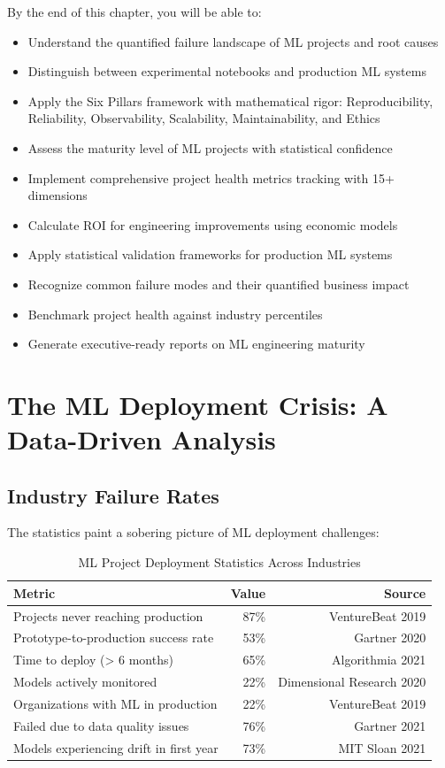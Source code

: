By the end of this chapter, you will be able to:

\begin{itemize}
    \item Understand the quantified failure landscape of ML projects and root causes
    \item Distinguish between experimental notebooks and production ML systems
    \item Apply the Six Pillars framework with mathematical rigor: Reproducibility, Reliability, Observability, Scalability, Maintainability, and Ethics
    \item Assess the maturity level of ML projects with statistical confidence
    \item Implement comprehensive project health metrics tracking with 15+ dimensions
    \item Calculate ROI for engineering improvements using economic models
    \item Apply statistical validation frameworks for production ML systems
    \item Recognize common failure modes and their quantified business impact
    \item Benchmark project health against industry percentiles
    \item Generate executive-ready reports on ML engineering maturity
\end{itemize}

\section{The ML Deployment Crisis: A Data-Driven Analysis}

\subsection{Industry Failure Rates}

The statistics paint a sobering picture of ML deployment challenges:

\begin{table}[h]
\centering
\caption{ML Project Deployment Statistics Across Industries}
\begin{tabular}{lrr}
\toprule
\textbf{Metric} & \textbf{Value} & \textbf{Source} \\
\midrule
Projects never reaching production & 87\% & VentureBeat 2019 \\
Prototype-to-production success rate & 53\% & Gartner 2020 \\
Time to deploy (> 6 months) & 65\% & Algorithmia 2021 \\
Models actively monitored & 22\% & Dimensional Research 2020 \\
Organizations with ML in production & 22\% & VentureBeat 2019 \\
Failed due to data quality issues & 76\% & Gartner 2021 \\
Models experiencing drift in first year & 73\% & MIT Sloan 2021 \\
\bottomrule
\end{tabular}
\end{table}

